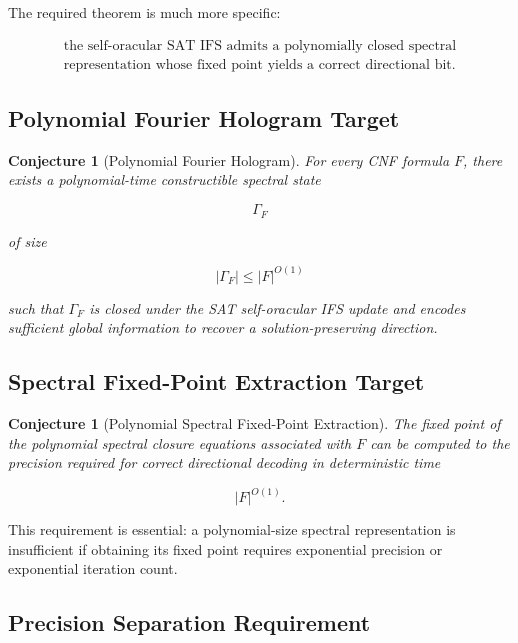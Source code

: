 \documentclass[11pt]{article}
\theoremstyle{plain}
\newtheorem{conjecture}[theorem]{Conjecture}
\theoremstyle{definition}
\begin{document}
The required theorem is much more specific:

\[
\boxed{\begin{gathered}
\text{the self-oracular SAT IFS admits a polynomially closed spectral}\\
\text{representation whose fixed point yields a correct directional bit}.
\end{gathered}}
\]

\subsection{Polynomial Fourier Hologram Target}

\begin{conjecture}[Polynomial Fourier Hologram]
\label{conj:polynomial-fourier-hologram}
For every CNF formula \(F\), there exists a polynomial-time constructible
spectral state

\[
    \Gamma_F
\]

of size

\[
    |\Gamma_F|
    \leq
    |F|^{O(1)}
\]

such that \(\Gamma_F\) is closed under the SAT self-oracular IFS update and
encodes sufficient global information to recover a solution-preserving
direction.
\end{conjecture}

\subsection{Spectral Fixed-Point Extraction Target}

\begin{conjecture}[Polynomial Spectral Fixed-Point Extraction]
\label{conj:spectral-fixed-point-extraction}
The fixed point of the polynomial spectral closure equations associated with
\(F\) can be computed to the precision required for correct directional
decoding in deterministic time

\[
    |F|^{O(1)}.
\]
\end{conjecture}

This requirement is essential: a polynomial-size spectral representation is
insufficient if obtaining its fixed point requires exponential precision or
exponential iteration count.

\subsection{Precision Separation Requirement}
\end{document}
